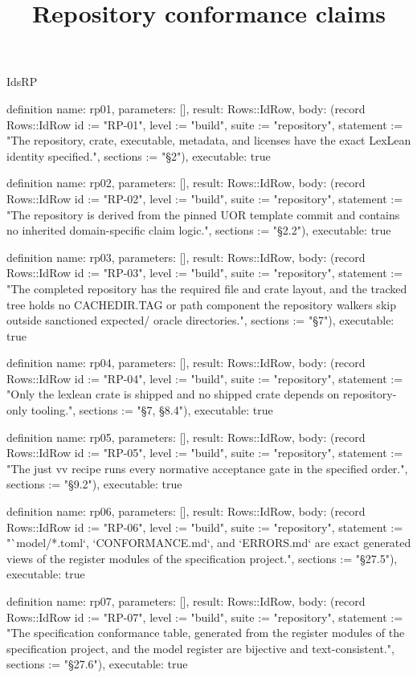 \begin{lexlean}{IdsRP}
\title{Repository conformance claims}
\begin{semanticmodule}
definition{
  name: rp01,
  parameters: [],
  result: Rows::IdRow,
  body: (record Rows::IdRow {id := "RP-01", level := "build", suite := "repository", statement := "The repository, crate, executable, metadata, and licenses have the exact LexLean identity specified.", sections := "§2"}),
  executable: true
}

definition{
  name: rp02,
  parameters: [],
  result: Rows::IdRow,
  body: (record Rows::IdRow {id := "RP-02", level := "build", suite := "repository", statement := "The repository is derived from the pinned UOR template commit and contains no inherited domain-specific claim logic.", sections := "§2.2"}),
  executable: true
}

definition{
  name: rp03,
  parameters: [],
  result: Rows::IdRow,
  body: (record Rows::IdRow {id := "RP-03", level := "build", suite := "repository", statement := "The completed repository has the required file and crate layout, and the tracked tree holds no CACHEDIR.TAG or path component the repository walkers skip outside sanctioned expected/ oracle directories.", sections := "§7"}),
  executable: true
}

definition{
  name: rp04,
  parameters: [],
  result: Rows::IdRow,
  body: (record Rows::IdRow {id := "RP-04", level := "build", suite := "repository", statement := "Only the lexlean crate is shipped and no shipped crate depends on repository-only tooling.", sections := "§7, §8.4"}),
  executable: true
}

definition{
  name: rp05,
  parameters: [],
  result: Rows::IdRow,
  body: (record Rows::IdRow {id := "RP-05", level := "build", suite := "repository", statement := "The just vv recipe runs every normative acceptance gate in the specified order.", sections := "§9.2"}),
  executable: true
}

definition{
  name: rp06,
  parameters: [],
  result: Rows::IdRow,
  body: (record Rows::IdRow {id := "RP-06", level := "build", suite := "repository", statement := "`model/*.toml`, `CONFORMANCE.md`, and `ERRORS.md` are exact generated views of the register modules of the specification project.", sections := "§27.5"}),
  executable: true
}

definition{
  name: rp07,
  parameters: [],
  result: Rows::IdRow,
  body: (record Rows::IdRow {id := "RP-07", level := "build", suite := "repository", statement := "The specification conformance table, generated from the register modules of the specification project, and the model register are bijective and text-consistent.", sections := "§27.6"}),
  executable: true
}


\end{semanticmodule}
\end{lexlean}
